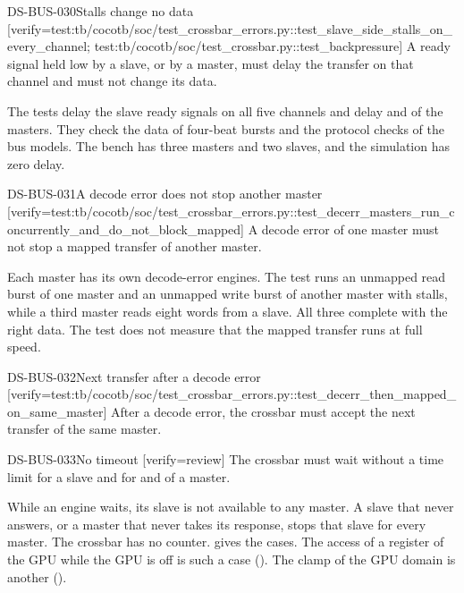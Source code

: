 \begin{requirement}{DS-BUS-030}{Stalls change no data}
[verify={test:tb/cocotb/soc/test_crossbar_errors.py::test_slave_side_stalls_on_every_channel; test:tb/cocotb/soc/test_crossbar.py::test_backpressure}]
A ready signal held low by a slave, or by a master, must delay the transfer on that channel and must not change its data.
\end{requirement}
\begin{information}
The tests delay the slave ready signals on all five channels and delay  and  of the masters. They check the data of four-beat bursts and the protocol checks of the bus models. The bench has three masters and two slaves, and the simulation has zero delay.
\end{information}

\begin{requirement}{DS-BUS-031}{A decode error does not stop another master}
[verify={test:tb/cocotb/soc/test_crossbar_errors.py::test_decerr_masters_run_concurrently_and_do_not_block_mapped}]
A decode error of one master must not stop a mapped transfer of another master.
\end{requirement}
\begin{information}
Each master has its own decode-error engines. The test runs an unmapped read burst of one master and an unmapped write burst of another master with stalls, while a third master reads eight words from a slave. All three complete with the right data. The test does not measure that the mapped transfer runs at full speed.
\end{information}

\begin{requirement}{DS-BUS-032}{Next transfer after a decode error}
[verify={test:tb/cocotb/soc/test_crossbar_errors.py::test_decerr_then_mapped_on_same_master}]
After a decode error, the crossbar must accept the next transfer of the same master.
\end{requirement}

\begin{requirement}{DS-BUS-033}{No timeout}
[verify={review}]
The crossbar must wait without a time limit for a slave and for  and  of a master.
\end{requirement}
\begin{information}
While an engine waits, its slave is not available to any master. A slave that never answers, or a master that never takes its response, stops that slave for every master. The crossbar has no counter.  gives the cases. The access of a register of the GPU while the GPU is off is such a case (). The clamp of the GPU domain is another ().
\end{information}

